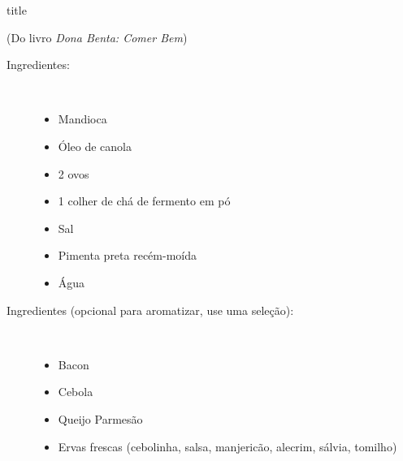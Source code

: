 \documentclass [11pt, letterpaper] {article}
\begin{document}
 {title}

\begin{flushright}
(Do livro {\it Dona Benta: Comer Bem})
\end{flushright}

\begin {description}

\item [Ingredientes:] \ \\
\begin {itemize}
\item Mandioca
\item Óleo de canola
\item 2 ovos
\item 1 colher de chá de fermento em pó
\item Sal
\item Pimenta preta recém-moída
\item Água
\end {itemize}

\item [Ingredientes (opcional para aromatizar, use uma seleção):] \ \\
\begin {itemize}
\item Bacon
\item Cebola
\item Queijo Parmesão
\item Ervas frescas (cebolinha, salsa, manjericão, alecrim, sálvia, tomilho)
\end {itemize}


\end{description}
\end{document}
